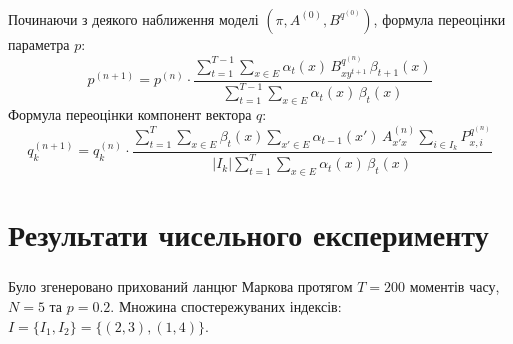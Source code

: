 \documentclass[12pt,mathserif]{beamer}
\theoremstyle{plain}
\begin{document}
\begin{frame}[t]
    \frametitle{\insertsection}

    Починаючи з деякого наближення моделі $\left( \pi,A^{(0)},B^{q^{(0)}} \right)$, формула переоцінки параметра $p:$
    \begin{equation*}
        p^{(n+1)} = p^{(n)}\cdot\frac{\sum\limits_{t=1}^{T-1}\sum\limits_{x \in E} \alpha_t(x)\,B^{q^{(n)}}_{xy^{t+1}}\,\beta_{t+1}(x)}{\sum\limits_{t=1}^{T-1}\sum\limits_{x \in E} \alpha_t(x)\,\beta_t(x)}
    \end{equation*}
    Формула переоцінки компонент вектора $q:$
    \begin{equation*}
        q_k^{(n+1)} = q_k^{(n)}\cdot\frac{\sum\limits_{t=1}^{T}\sum\limits_{x \in E}\beta_{t}(x)\sum\limits_{x' \in E} \alpha_{t-1}(x')\,A^{(n)}_{x'x}\sum\limits_{i \in I_k}P^{q^{(n)}}_{x,i}}{|I_k|\sum\limits_{t=1}^{T}\sum\limits_{x \in E} \alpha_t(x)\,\beta_t(x)}
    \end{equation*}
\end{frame}

\section{Результати чисельного експерименту}

\begin{frame}[t]
    \frametitle{\insertsection}
    Було згенеровано прихований ланцюг Маркова протягом $T=200$ моментів часу, $N=5$ та $p=0.2$. Множина спостережуваних індексів: $I=\{I_1,I_2\}=\{(2,3),(1,4)\}$.

    \begin{figure}[H]\centering
        
    \end{figure}
\end{frame}
\end{document}
